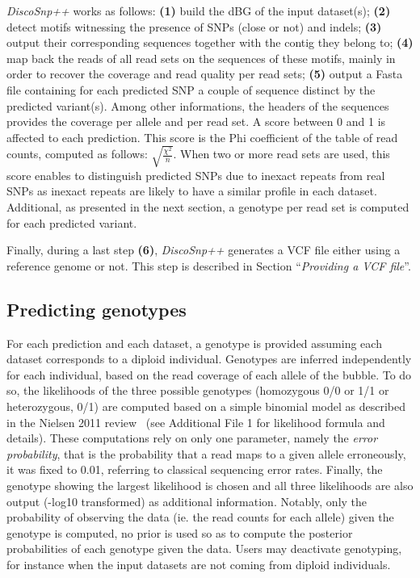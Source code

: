 \documentclass{bmcart}
\newcommand{\discopp}{{\it DiscoSnp++}\xspace}
\begin{document}
\discopp works as follows: \textbf{(1)} build the dBG of the input dataset(s);  \textbf{(2)} detect motifs witnessing the presence of SNPs (close or not) and indels; \textbf{(3)} output their corresponding sequences together with the contig they belong to; \textbf{(4)} map back the reads of all read sets on the sequences of these motifs, mainly in order to recover the coverage and read quality per read sets; \textbf{(5)} output a Fasta file containing for each predicted SNP a couple of sequence distinct by the predicted variant(s). Among other informations, the headers of the sequences provides the coverage per allele and per read set. 
A score between 0 and 1 is affected to each prediction. This score is the Phi coefficient of the table of read counts, computed as follows: $\sqrt{\frac{\chi^2}{n}}$. When two or more read sets are used, this score enables to distinguish predicted SNPs due to inexact repeats from real SNPs as inexact repeats are likely to have a similar profile in each dataset.  Additional, as presented in the next section, a genotype per read set is computed for each predicted variant. 

Finally, during a last step \textbf{(6)}, \discopp generates a VCF file either using a reference genome or not. This step is described in Section ``\emph{Providing a VCF file}''.



\subsection*{Predicting genotypes}
For each prediction and each dataset, a genotype is provided assuming each dataset corresponds to a diploid individual. Genotypes are inferred independently for each individual, based on the read coverage of each allele of the bubble. To do so, the likelihoods of the three possible genotypes (homozygous 0/0 or 1/1 or heterozygous, 0/1) are computed based on a simple binomial model as described in the Nielsen 2011 review~\cite{Nielsen2011} (see Additional File 1 for likelihood formula and details). These computations rely on only one parameter, namely the \emph{error probability}, that is the probability that a read maps to a given allele erroneously,
 it was fixed to 0.01, referring to classical sequencing error rates. Finally, the genotype showing the largest likelihood is chosen and all three likelihoods are also output (-log10 transformed) as additional information. Notably, only the probability of observing the data (ie. the read counts for each allele) given the genotype is computed, no prior is used so as to compute the posterior probabilities of each genotype given the data. Users may deactivate genotyping, for instance when the input datasets are not coming from diploid individuals.
\end{document}
